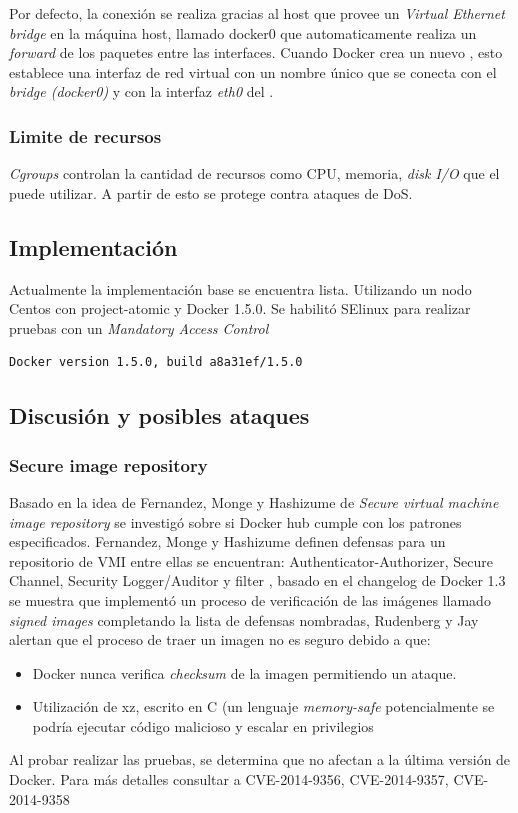 \documentclass[letter,10pt]{article}
\begin{document}
	Por defecto, la conexión se realiza gracias al host que provee un \emph{Virtual Ethernet bridge} en la máquina host, llamado docker0 que automaticamente realiza un \emph{forward} de los paquetes entre las interfaces. Cuando Docker crea un nuevo \container, esto establece una interfaz de red virtual con un nombre único que se conecta con el \emph{bridge (docker0)} y con la interfaz \emph{eth0} del \container. \cite{bui2015analysis}
	
	\subsubsection{Limite de recursos}
	
	\emph{Cgroups} controlan la cantidad de recursos como CPU, memoria, \emph{disk I/O} que el \container puede utilizar. A partir de esto se protege contra ataques de DoS.

\subsection{Implementación}

Actualmente la implementación base se encuentra lista. Utilizando un nodo
Centos con project-atomic y Docker 1.5.0. Se habilitó SElinux para
realizar pruebas con un \emph{Mandatory Access Control}

\begin{verbatim}
Docker version 1.5.0, build a8a31ef/1.5.0
\end{verbatim}


\subsection{Discusión y posibles ataques}	

\subsubsection{Secure image repository}
Basado en la idea de Fernandez, Monge y Hashizume  de \emph{Secure
virtual machine image repository} \cite{fernandez_monge:2015} se investigó sobre si Docker hub cumple con los patrones especificados.  Fernandez, Monge y Hashizume definen defensas para un repositorio de VMI entre ellas se encuentran: Authenticator-Authorizer, Secure Channel, Security Logger/Auditor y filter \cite{fernandez_monge:2015}, basado en el changelog de Docker 1.3 se muestra que implementó un proceso de verificación de las imágenes llamado \emph{signed images} completando la lista de defensas nombradas,  Rudenberg \cite{rudenberg:2015:Online} y Jay \cite{jay:2014:Online} alertan que el proceso de traer un imagen no es seguro debido a que:
		\begin{itemize}
			\item Docker nunca verifica \emph{checksum} de la imagen permitiendo un ataque.
			\item Utilización de xz, escrito en C (un lenguaje \emph{memory-safe} potencialmente se podría ejecutar código malicioso y escalar en privilegios
		\end{itemize}
	Al probar realizar las pruebas, se determina que no afectan a la última versión de Docker.  Para más detalles consultar a CVE-2014-9356, CVE-2014-9357, CVE-2014-9358 \cite{lvm-cve:2014:Online}
\end{document}
